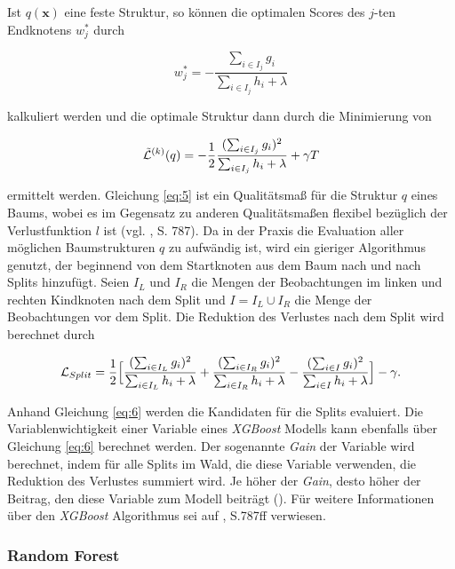 \documentclass[a4paper,11pt]{article}
\begin{document}
Ist $q(\bm{x})$ eine feste Struktur, so können die optimalen Scores des $j$-ten Endknotens $w_j^*$ durch

\[ w_j^* = - \frac{\sum_{i \in I_j}g_i}{\sum_{i \in I_j}h_i + \lambda} \]

kalkuliert werden und die optimale Struktur dann durch die Minimierung von 

\begin{equation}\label{eq:5}
    \Tilde{\mathcal{L}}^{(k)}(q) = -\frac{1}{2} \frac{(\sum_{i \in I_j}g_i)^2}{\sum_{i \in I_j}h_i + \lambda} + \gamma T
\end{equation}

ermittelt werden. Gleichung \ref{eq:5} ist ein Qualitätsmaß für die Struktur $q$ eines Baums, wobei es im Gegensatz zu anderen Qualitätsmaßen flexibel bezüglich der Verlustfunktion $l$ ist (vgl. \cite{XGBoost}, S. 787).
Da in der Praxis die Evaluation aller möglichen Baumstrukturen $q$ zu aufwändig ist, wird ein gieriger Algorithmus genutzt, der beginnend von dem Startknoten aus dem Baum nach und nach Splits hinzufügt. Seien $I_L$ und $I_R$ die Mengen der Beobachtungen im linken und rechten Kindknoten nach dem Split und $I = I_L \cup I_R$ die Menge der Beobachtungen vor dem Split. Die Reduktion des Verlustes nach dem Split wird berechnet durch
 
 \begin{equation}\label{eq:6}
    \mathcal{L}_{Split} = \frac{1}{2} \Bigl[ \frac{(\sum_{i \in I_L}g_i)^2}{\sum_{i \in I_L}h_i + \lambda} + \frac{(\sum_{i \in I_R}g_i)^2}{\sum_{i \in I_R}h_i + \lambda} - \frac{(\sum_{i \in I}g_i)^2}{\sum_{i \in I}h_i + \lambda} \Bigr] - \gamma . 
\end{equation}{} 

Anhand Gleichung \ref{eq:6} werden die Kandidaten für die Splits evaluiert. Die Variablenwichtigkeit einer Variable eines \textit{XGBoost} Modells kann ebenfalls über Gleichung \ref{eq:6} berechnet werden. Der sogenannte \textit{Gain} der Variable wird berechnet, indem für alle Splits im Wald, die diese Variable verwenden, die Reduktion des Verlustes summiert wird. Je höher der \textit{Gain}, desto höher der Beitrag, den diese Variable zum Modell beiträgt (\cite{XGBoostR}). Für weitere Informationen über den \textit{XGBoost} Algorithmus sei auf \cite{XGBoost}, S.787ff verwiesen.


\subsubsection{Random Forest}\label{kap:RF}
\end{document}
